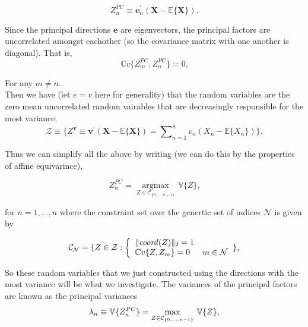 \documentclass{article}
\theoremstyle{definition}
\theoremstyle{remark}
\begin{document}
\begin{equation}
    Z_{n}^{\mathit{PC}}\equiv\boldsymbol{e}_{n}^{\prime}(\boldsymbol{X}-\mathbb{E}\{\boldsymbol{X}\})\text{.}
    \end{equation}

Since the principal directions $\boldsymbol{e}$ are eigenvectors, the principal
factors are uncorrelated amongst eachother (so the covariance matrix with one another is diagonal). That is, 
\begin{equation}
    \mathbb{C}v\{Z_{m}^{\mathit{PC}},Z_{n}^{\mathit{PC}}\}=0\text{,}
    \end{equation}

For any $m \neq n$.\\
Then we have (let $e = v$ here for generality) that the random variables are the zero mean uncorrelated
random vairables that are decreasingly responsible for the most variance. 
\begin{equation}
    \mathcal{Z}\equiv\{Z^{\boldsymbol{v}}\equiv\boldsymbol{v}^{\prime}(\boldsymbol{X}-\mathbb{E}\{\boldsymbol{X}\})={\textstyle\sum\nolimits_{n=1}^{\bar{n}}} v_{n}(X_{n}-\mathbb{E}\{X_{n}\})\}\text{.}
    \end{equation}

Thus we can simplify all the above by writing (we can do this by the properties of affine equivarince), 

\begin{equation}
    Z_{n}^{\mathit{PC}}=\operatorname*{argmax}\limits_{Z\in\mathcal{C}_{\{0,...,n-1\}}}\,\mathbb{V}\{Z\}\text{,}
    \end{equation}

for $n = 1,\dots, n$ where the constraint set over the genertic set of indices $\mathcal{N}$ is given by

\begin{equation}
    \mathcal{C}_{\mathcal{N}}=\{Z\in\mathcal{Z}:\left\{ \begin{array}
    [c]{ll}\Vert\mathit{coord}(Z)\Vert_{2}=1 & \\
    \mathbb{C}v\{Z,Z_{m}\}=0 & m\in\mathcal{N}
    \end{array} \right. \}\text{,}
    \end{equation}


So these random variables that we just constructed using the directions with
the most variance will be what we investigate. The variances of the principal factors 
are known as the principal variances
\begin{equation}
    \lambda_{n}\equiv\mathbb{V}\{Z_{n}^{\mathit{PC}}\}=\max\nolimits\limits_{Z\in\mathcal{C}_{\{0,...,n-1\}}}\,\mathbb{V}\{Z\}\text{,}
    \end{equation}
\end{document}
